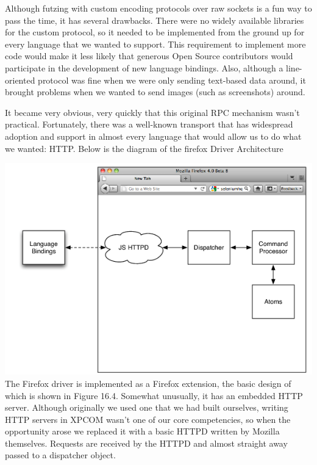 \documentclass[12pt]{report}
\begin{document}
Although futzing with custom encoding protocols over raw sockets is a fun way to pass the time, it has several drawbacks. There were no widely available libraries for the custom protocol, so it needed to be implemented from the ground up for every language that we wanted to support. This requirement to implement more code would make it less likely that generous Open Source contributors would participate in the development of new language bindings. Also, although a line-oriented protocol was fine when we were only sending text-based data around, it brought problems when we wanted to send images (such as screenshots) around.

It became very obvious, very quickly that this original RPC mechanism wasn't practical. Fortunately, there was a well-known transport that has widespread adoption and support in almost every language that would allow us to do what we wanted: HTTP. Below is the diagram of the firefox Driver Architecture

\includegraphics[scale=1]{FireFoxDriver}
The Firefox driver is implemented as a Firefox extension, the basic design of which is shown in Figure 16.4. Somewhat unusually, it has an embedded HTTP server. Although originally we used one that we had built ourselves, writing HTTP servers in XPCOM wasn't one of our core competencies, so when the opportunity arose we replaced it with a basic HTTPD written by Mozilla themselves. Requests are received by the HTTPD and almost straight away passed to a dispatcher object.
\end{document}
